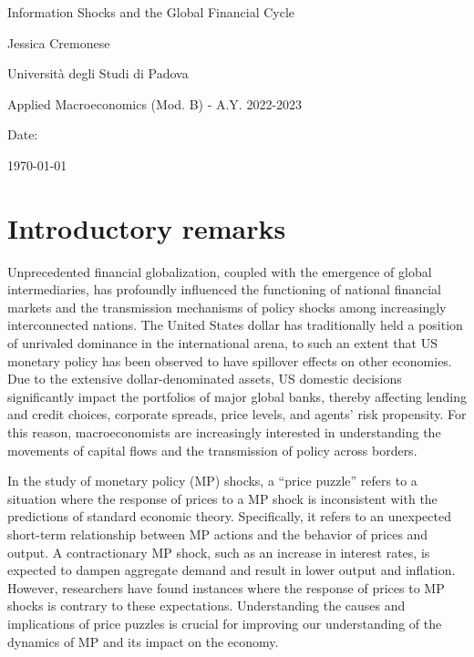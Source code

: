 \documentclass[11pt,a4paper]{article}
\begin{document}
\begin{titlepage}
    \centering
    \vspace*{2cm}
    {\LARGE Information Shocks and the Global Financial Cycle \par}
    \vspace{2cm}
    {\large Jessica Cremonese \par}
    \vspace{1cm}
    {\large Università degli Studi di Padova \par}
    \vspace{1cm}
    {\large Applied Macroeconomics (Mod. B) - A.Y. 2022-2023 \par}
    \vspace{1cm}
    {\large Date: \par}
    {\large \today \par}
\end{titlepage}


\newpage
\section{Introductory remarks}    
Unprecedented financial globalization, coupled with the emergence of global intermediaries, has profoundly influenced the functioning of national financial markets and the transmission mechanisms of policy shocks among increasingly interconnected nations.
The United States dollar has traditionally held a position of unrivaled dominance in the international arena, to such an extent that US monetary policy has been observed to have spillover effects on other economies.
Due to the extensive dollar-denominated assets, US domestic decisions significantly impact the portfolios of major global banks, thereby affecting lending and credit choices, corporate spreads, price levels, and agents' risk propensity.
For this reason, macroeconomists are increasingly interested in understanding the movements of capital flows and the transmission of policy across borders. 

In the study of monetary policy (MP) shocks, a \enquote{price puzzle} refers to a situation where the response of prices to a MP shock is inconsistent with the predictions of standard economic theory. Specifically, it refers to an unexpected short-term relationship between MP actions and the behavior of prices and output. 
A contractionary MP shock, such as an increase in interest rates, is expected to dampen aggregate demand and result in lower output and inflation. However, researchers have found instances where the response of prices to MP shocks is contrary to these expectations. 
Understanding the causes and implications of price puzzles is crucial for improving our understanding of the dynamics of MP and its impact on the economy.
\end{document}
